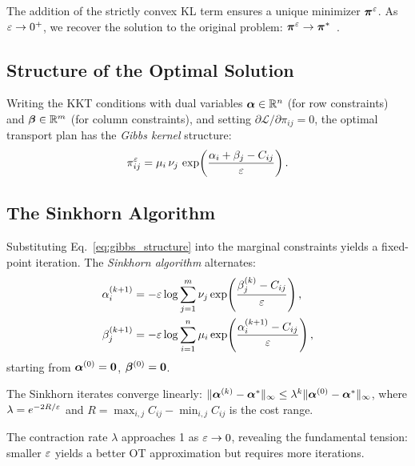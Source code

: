 The addition of the strictly convex KL term ensures a unique minimizer $\bm{\pi}^\varepsilon$. As $\varepsilon \to 0^+$, we recover the solution to the original problem: $\bm{\pi}^\varepsilon \to \bm{\pi}^*$~\citep{peyre2019computational}.

\subsection{Structure of the Optimal Solution}

Writing the KKT conditions with dual variables $\bm{\alpha} \in \mathbb{R}^n$ (for row constraints) and $\bm{\beta} \in \mathbb{R}^m$ (for column constraints), and setting $\partial \mathcal{L} / \partial \pi_{ij} = 0$, the optimal transport plan has the \emph{Gibbs kernel} structure:
\begin{equation}
    \label{eq:gibbs_structure}
    \pi_{ij}^\varepsilon = \mu_i \, \nu_j \, \exp\!\left(\frac{\alpha_i + \beta_j - C_{ij}}{\varepsilon}\right).
\end{equation}

\subsection{The Sinkhorn Algorithm}

Substituting Eq.~\eqref{eq:gibbs_structure} into the marginal constraints yields a fixed-point iteration. The \emph{Sinkhorn algorithm} alternates:
\begin{align}
    \label{eq:sinkhorn_alpha}
    \alpha_i^{(k+1)} &= -\varepsilon \log \sum_{j=1}^m \nu_j \exp\!\left(\frac{\beta_j^{(k)} - C_{ij}}{\varepsilon}\right), \\
    \label{eq:sinkhorn_beta}
    \beta_j^{(k+1)} &= -\varepsilon \log \sum_{i=1}^n \mu_i \exp\!\left(\frac{\alpha_i^{(k+1)} - C_{ij}}{\varepsilon}\right),
\end{align}
starting from $\bm{\alpha}^{(0)} = \mathbf{0}$, $\bm{\beta}^{(0)} = \mathbf{0}$.

\begin{theorem}
\label{thm:convergence}
The Sinkhorn iterates converge linearly:
$\|\bm{\alpha}^{(k)} - \bm{\alpha}^*\|_\infty \leq \lambda^k \|\bm{\alpha}^{(0)} - \bm{\alpha}^*\|_\infty$,
where $\lambda = e^{-2R/\varepsilon}$ and $R = \max_{i,j} C_{ij} - \min_{i,j} C_{ij}$ is the cost range.
\end{theorem}

The contraction rate $\lambda$ approaches 1 as $\varepsilon \to 0$, revealing the fundamental tension: smaller $\varepsilon$ yields a better OT approximation but requires more iterations.
